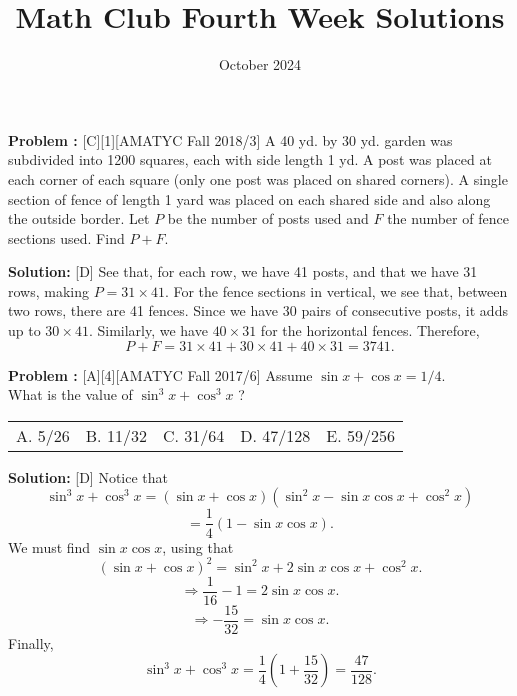 \documentclass[12pt]{article}
\title{Math Club Fourth Week Solutions}
\date{October 2024}
\makeatletter
\newcounter{problem}
\newenvironment{problem}{%
    \stepcounter{problem}
    \noindent\textbf{Problem \theproblem:}%
}{%
    \par
}
\newenvironment{solution}{%
    \vspace{1em} %
    \noindent\textbf{Solution:}%
}{%
    \par
}
\newcommand{\multChoice}[5]{%
    \begin{tabular}{l @{\hskip 1.5cm} l @{\hskip 1.5cm} l @{\hskip 1.5cm} l @{\hskip 1.5cm} l}
    A. #1 & B. #2 & C. #3 & D. #4 & E. #5
\end{tabular}
}
\makeatother
\begin{document}
\maketitle



\begin{problem}[C][1][AMATYC Fall 2018/3]
   A 40 yd. by 30 yd. garden was subdivided into 1200 squares, each with
   side length 1 yd. A post was placed at each corner of each square (only one
   post was placed on shared corners). A single section of fence of length 1
   yard was placed on each shared side and also along the outside border. Let
   $P$ be the number of posts used and $F$ the number of fence sections used. Find $P + F$. 
\end{problem}


\begin{solution}[D]
See that, for each row, we have 41 posts, and that we have 31 rows, making $P=31 \times 41$.
For the fence sections in vertical, we see that, between two rows, there are 41 fences. Since we have 30 pairs of consecutive posts, it adds up to $30 \times 41$. Similarly, we have $40 \times 31$ for the horizontal fences. Therefore, 
\[
P+F= 31 \times 41 + 30 \times 41 + 40 \times 31 = 3741.
\]
\end{solution}

\vskip 1cm

\begin{problem}[A][4][AMATYC Fall 2017/6]
   Assume $\sin x + \cos x = 1/4$. \\
   What is the value of $\sin^3x + \cos^3x $ ? 
\end{problem}
\multChoice{5/26}{11/32}{31/64}{47/128}{59/256}

\begin{solution}[D]
Notice that 
\[
\sin^3x + \cos^3x = (\sin x + \cos x)(\sin^2x - \sin x \cos x + \cos^2x)
\]
\[
= \frac{1}{4} \left ( 1 - \sin x \cos x \right ).
\]
We must find $\sin x \cos x$, using that
\[
(\sin x + \cos x)^2 = \sin^2x + 2\sin x \cos x + \cos^2x.
\]
\[
\Rightarrow \frac{1}{16} - 1 = 2\sin x \cos x.
\]
\[
\Rightarrow -\frac{15}{32} = \sin x \cos x.
\]
Finally,
\[
\sin^3x + \cos^3x = \frac{1}{4} \left ( 1 + \frac{15}{32} \right ) = \frac{47}{128}.
\]
\end{solution}

\vskip 1cm
\end{document}
